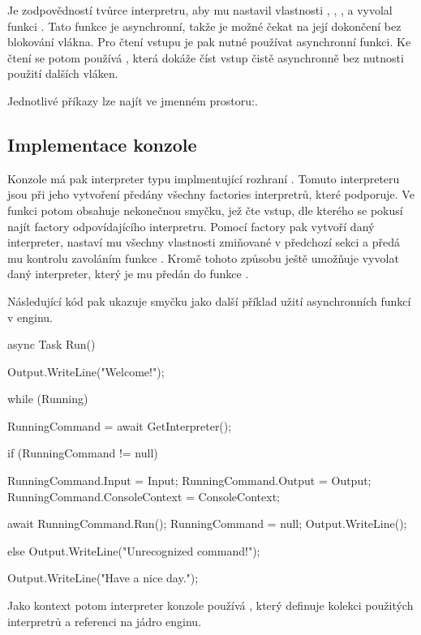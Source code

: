 Je zodpovědností tvůrce interpretru, aby mu nastavil vlastnosti , , , 
a vyvolal funkci . Tato funkce je asynchronní, takže je možné čekat na její dokončení bez blokování vlákna. Pro
čtení vstupu je pak nutné používat asynchronní funkci. Ke čtení  se potom používá ,
která dokáže číst vstup čistě asynchronně bez nutnosti použití dalších vláken.

 Jednotlivé příkazy lze najít ve jmenném prostoru:\newline {}.

\subsection{Implementace konzole}
Konzole má pak interpreter typu  implmentující rozhraní . Tomuto interpreteru
jsou při jeho vytvoření předány všechny factories interpretrů, které podporuje. Ve funkci  potom
obsahuje nekonečnou smyčku, jež čte vstup, dle kterého se pokusí najít factory odpovídajícího interpretru. Pomocí
factory pak vytvoří daný interpreter, nastaví mu všechny vlastnosti zmiňované v předchozí sekci a předá mu kontrolu
zavoláním funkce . Kromě tohoto způsobu ještě umožňuje vyvolat daný interpreter, který je mu předán 
do funkce .

Následující kód pak ukazuje smyčku  jako další příklad užití asynchronních funkcí v enginu.

\begin{code}
async Task Run()
{
   Output.WriteLine("Welcome!"); 

   while (Running)
   {
      RunningCommand = await GetInterpreter();

      if (RunningCommand != null)
      {
         RunningCommand.Input = Input;
         RunningCommand.Output = Output;
         RunningCommand.ConsoleContext = ConsoleContext;

         await RunningCommand.Run();
         RunningCommand = null;
         Output.WriteLine();
      }
      else
      {
         Output.WriteLine("Unrecognized command!");
      }
   }

   Output.WriteLine("Have a nice day.");
}
\end{code}

Jako kontext potom interpreter konzole používá , který definuje kolekci použitých interpretrů a referenci na jádro enginu.


